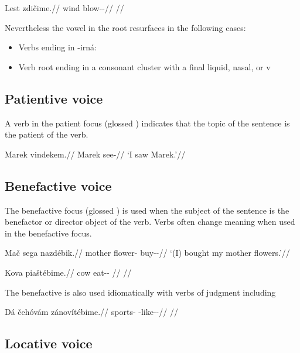 \pex
\begingl
\gla Lest zdičime.//
\glb wind blow-\Av{}-\Prog{}//
\glft {}//
\endgl
\xe

Nevertheless the vowel  in the root resurfaces in the following cases:

\begin{itemize}
	\item Verbs ending in -irná:
	\item Verb root ending in a consonant cluster with a final liquid, nasal, or v
\end{itemize}

\subsection{Patientive voice}
\par A verb in the patient focus (glossed \Acc{}) indicates that the topic of the sentence is the patient of the verb.

\pex
\begingl
\gla Marek vindekem.//
\glb Marek see-//
\glft `I saw Marek.'//
\endgl
\xe


\subsection{Benefactive voice}
\par The benefactive focus (glossed ) is used when the subject of the sentence is the benefactor or director object of the verb. Verbs often change meaning when used in the benefactive focus.


\begin{multicols}{2}
\pex
\begingl
\gla Mač sega nazdébik.//
\glb mother flower-\Acc{} buy-\Ben{}-\Pf{}//
\glft `(I) bought my mother flowers.'//
\endgl
\xe

\pex
\begingl
\gla Kova piaštébime.//
\glb cow eat-\Ben{}-\Prog{} //
\glft {}//
\endgl
\xe

\end{multicols}

The benefactive is also used idiomatically with verbs of judgment including  

\pex
\begingl
\gla Dá čehóvám zánovítébime.//
\glb \First\Sg{} sports-\Agt{} \Neg{}-like-\Ben{}-\Prog{}//
\glft {}//
\endgl
\xe

\subsection{Locative voice}

